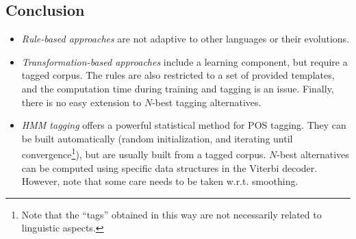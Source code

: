 \subsection{Conclusion}
\begin{itemize}
	\item \emph{Rule-based approaches} are not adaptive to other languages or their evolutions.
	\item \emph{Transformation-based approaches} include a learning component, but require a tagged corpus.
	The rules are also restricted to a set of provided templates, and the computation time during training and tagging is an issue.
	Finally, there is no easy extension to \(N\)-best tagging alternatives.
	\item \emph{HMM tagging} offers a powerful statistical method for POS tagging.
	They can be built automatically (random initialization, and iterating until convergence\footnote{Note that the ``tags'' obtained in this way are not necessarily related to linguistic aspects.}), but are usually built from a tagged corpus.
	\(N\)-best alternatives can be computed using specific data structures in the Viterbi decoder.
	However, note that some care needs to be taken w.r.t. smoothing.
\end{itemize}